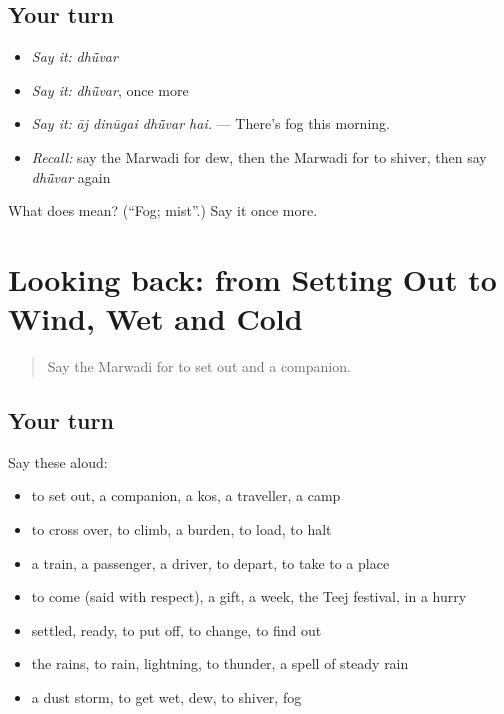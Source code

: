 \subsection*{Your turn}
\begin{itemize}
\raggedright
  \item \emph{Say it:} \emph{dhū̃var}
  \item \emph{Say it:} \emph{dhū̃var}, once more
  \item \emph{Say it:} \emph{āj dinūgai dhū̃var hai.} — There's fog this morning.
  \item \emph{Recall:} say the Marwadi for dew, then the Marwadi for to shiver, then say \emph{dhū̃var} again
\end{itemize}

\begin{tcolorbox}[breakable,colback=teal!4,colframe=teal!35!black,title={Before you move on}]
What does  mean? (\textquotedblleft{}Fog; mist\textquotedblright{}.) Say it once more.
\end{tcolorbox}
\section[(dialogue)]{Looking back: from Setting Out to Wind, Wet and Cold}

\label{lesson:MW-R222-review-216-222}



\begin{quote}
Say the Marwadi for to set out and a companion.
\end{quote}

\subsection*{Your turn}
Say these aloud:

\begin{itemize}
\raggedright
  \item to set out, a companion, a kos, a traveller, a camp
  \item to cross over, to climb, a burden, to load, to halt
  \item a train, a passenger, a driver, to depart, to take to a place
  \item to come (said with respect), a gift, a week, the Teej festival, in a hurry
  \item settled, ready, to put off, to change, to find out
  \item the rains, to rain, lightning, to thunder, a spell of steady rain
  \item a dust storm, to get wet, dew, to shiver, fog
\end{itemize}

